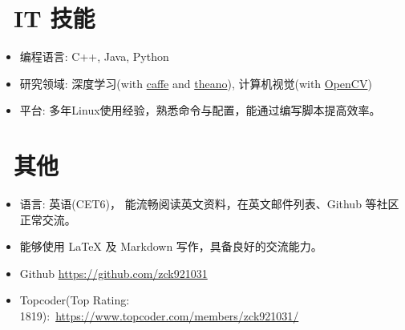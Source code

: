 \documentclass{resume}
\begin{document}

\section{\faCogs\ IT 技能}
\begin{itemize}[parsep=0.5ex]
  \item 编程语言: C++, Java, Python
  \item 研究领域: 深度学习(with \href{http://caffe.berkeleyvision.org/}{caffe} and \href{http://deeplearning.net/software/theano/}{theano}), 计算机视觉(with \href{http://opencv.org/}{OpenCV})
  \item 平台: 多年Linux使用经验，熟悉命令与配置，能通过编写脚本提高效率。
\end{itemize}

\section{\faInfo\ 其他}
\begin{itemize}[parsep=0.5ex]
  \item 语言: 英语(CET6)， 能流畅阅读英文资料，在英文邮件列表、Github 等社区正常交流。
  \item 能够使用 LaTeX 及 Markdown 写作，具备良好的交流能力。
  \item \faGithub Github \href{https://github.com/zck921031}{https://github.com/zck921031}
  \item Topcoder(Top Rating: 1819):\  \href{https://www.topcoder.com/members/zck921031/}{https://www.topcoder.com/members/zck921031/}
\end{itemize}

%
%
\end{document}
